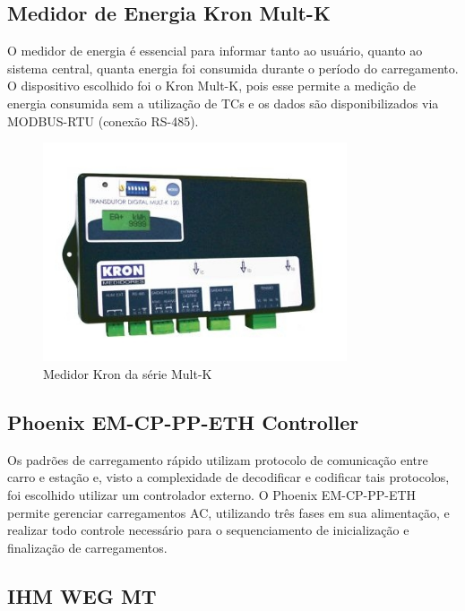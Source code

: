 \subsection{Medidor de Energia Kron Mult-K}

O medidor de energia é essencial para informar tanto ao usuário, quanto ao sistema central, quanta energia foi consumida durante o período do carregamento. O dispositivo escolhido foi o Kron Mult-K, pois esse permite a medição de energia consumida sem a utilização de TCs e os dados são disponibilizados via MODBUS-RTU (conexão RS-485).

\begin{figure}[H]
        \begin{center}
                \includegraphics[width=0.8\textwidth,natwidth=400,natheight=288]{assets/images/devices-kron.jpg}
                \caption{Medidor Kron da série Mult-K}
                \label{fig:bbb}
        \end{center}
\end{figure}

\subsection{Phoenix EM-CP-PP-ETH Controller}

Os padrões de carregamento rápido utilizam protocolo de comunicação entre carro e estação e, visto a complexidade de decodificar e codificar tais protocolos, foi escolhido utilizar um controlador externo. O Phoenix EM-CP-PP-ETH permite gerenciar carregamentos AC, utilizando três fases em sua alimentação, e realizar todo controle necessário para o sequenciamento de inicialização e finalização de carregamentos.

\subsection{IHM WEG MT}

